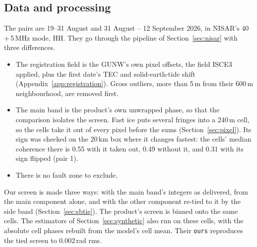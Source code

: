 \subsection{Data and processing}
The pairs are 19--31 August and 31 August -- 12 September 2026, in NISAR's 40\,+\,5\,MHz mode, HH. They go through the
pipeline of Section~\ref{sec:nisar} with three differences.
\begin{itemize}
  \item The registration field is the GUNW's own pixel offsets, the field ISCE3 applied, plus the first date's TEC and
        solid-earth-tide shift (Appendix~\ref{app:registration}). Gross outliers, more than 5\,m from their 600\,m
        neighbourhood, are removed first.
  \item The main band is the product's own unwrapped phase, so that the comparison isolates the screen. Fast ice puts
        several fringes into a 240\,m cell, so the cells take it out of every pixel before the sums
        (Section~\ref{sec:pixel}). Its sign was checked on the 20\,km box where it changes fastest: the cells' median
        coherence there is 0.55 with it taken out, 0.49 without it, and 0.31 with its sign flipped (pair 1).
  \item There is no fault zone to exclude.
\end{itemize}
Our screen is made three ways: with the main band's integers as delivered, from the main component alone, and with the
other component re-tied to it by the side band (Section~\ref{sec:sbtie}). The product's screen is binned onto the same
cells. The estimators of Section~\ref{sec:synthetic} also run on these cells, with the absolute cell phases rebuilt from
the model's cell mean. Their \texttt{ours} reproduces the tied screen to 0.002\,rad rms.

\begin{table}[p]
\centering
\caption{The Antarctic pairs (track 94 descending, frame 129).
\emph{The product's screen minus ours}, cell by cell: component 1's offset in main-band cycles (3.21\,rad), the block's
in cycles of the double difference (72.96\,rad), and what is left.
\emph{The split of component 1}, read three ways in the same 17 windows along the boundary, beside GrIMP's fix, and the
non-dispersive step across the gap there.
\emph{Over the tributary's trunk}: the plateau left after the integers, what ISCE3's correction passes add there on our
cells, and the leak (slope, and $r$ in brackets, of the screen's 15\,km high-pass on the non-dispersive phase's) with
the cells within 5\,km of either integer step left out.
\emph{The offsets' ionosphere} minus each screen: where the screens differ, $(\phiA - k\rho_\mathrm{off})$ smoothed over
3\,km and calibrated on ours; over the frame, $(\phiA - k\rho_\mathrm{off})/2$ uncalibrated, both smoothed over 6\,km, a
median and a plane removed per screen.
\emph{nisarErrors' residual metric} against an ITS\_LIVE synthetic, on slow grounded ice ($<$50\,m/yr).
\emph{Pair 1 minus pair 2}: the corrected phases' difference, a median and a plane removed, on the pixels coherent in
both.}
\label{tab:antarctica}
\small
\setlength{\tabcolsep}{4pt}

\end{table}

